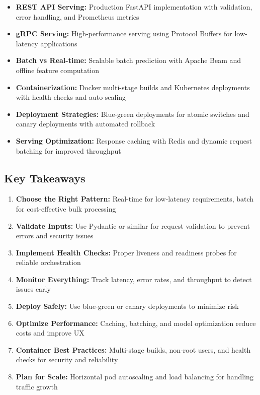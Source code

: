 \begin{itemize}
    \item \textbf{REST API Serving:} Production FastAPI implementation with validation, error handling, and Prometheus metrics

    \item \textbf{gRPC Serving:} High-performance serving using Protocol Buffers for low-latency applications

    \item \textbf{Batch vs Real-time:} Scalable batch prediction with Apache Beam and offline feature computation

    \item \textbf{Containerization:} Docker multi-stage builds and Kubernetes deployments with health checks and auto-scaling

    \item \textbf{Deployment Strategies:} Blue-green deployments for atomic switches and canary deployments with automated rollback

    \item \textbf{Serving Optimization:} Response caching with Redis and dynamic request batching for improved throughput
\end{itemize}

\subsection{Key Takeaways}

\begin{enumerate}
    \item \textbf{Choose the Right Pattern:} Real-time for low-latency requirements, batch for cost-effective bulk processing

    \item \textbf{Validate Inputs:} Use Pydantic or similar for request validation to prevent errors and security issues

    \item \textbf{Implement Health Checks:} Proper liveness and readiness probes for reliable orchestration

    \item \textbf{Monitor Everything:} Track latency, error rates, and throughput to detect issues early

    \item \textbf{Deploy Safely:} Use blue-green or canary deployments to minimize risk

    \item \textbf{Optimize Performance:} Caching, batching, and model optimization reduce costs and improve UX

    \item \textbf{Container Best Practices:} Multi-stage builds, non-root users, and health checks for security and reliability

    \item \textbf{Plan for Scale:} Horizontal pod autoscaling and load balancing for handling traffic growth
\end{enumerate}

